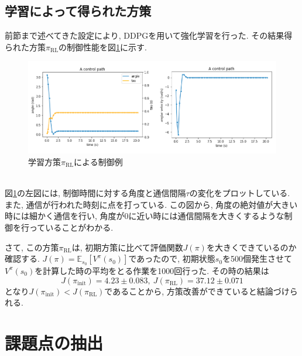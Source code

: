 \documentclass[dvipdfmx]{ampmt}
\newcommand{\expect}{\mathbb{E}}
\begin{document}
\subsection{学習によって得られた方策}
前節まで述べてきた設定により, DDPGを用いて強化学習を行った. その結果得られた方策$\pi_{\textrm{RL}}$の制御性能を図\ref{control_path}に示す. 
\begin{figure}[h]
	\centering
 	\includegraphics[width=12cm]{control_path.png}
 	\caption{学習方策$\pi_{\textrm{RL}}$による制御例} \label{control_path}
\end{figure}\\
図\ref{control_path}の左図には, 制御時間に対する角度と通信間隔$\tau$の変化をプロットしている. また, 通信が行われた時刻に点を打っている. この図から, 角度の絶対値が大きい時には細かく通信を行い, 角度が0に近い時には通信間隔を大きくするような制御を行っていることがわかる. \par
さて, この方策$\pi_{\textrm{RL}}$は, 初期方策に比べて評価関数$J(\pi)$を大きくできているのか確認する. $J(\pi) = \expect_{s_0}[V^{\pi}(s_0)]$であったので, 初期状態$s_0$を500個発生させて$V^{\pi}(s_0)$を計算した時の平均をとる作業を1000回行った. その時の結果は
\begin{equation}
	J(\pi_{\textrm{init}}) = 4.23 \pm 0.083,~J(\pi_{\textrm{RL}}) = 37.12 \pm 0.071 \label{compare_policy}
\end{equation}
となり$J(\pi_{\textrm{init}}) < J(\pi_{\textrm{RL}})$であることから, 方策改善ができていると結論づけられる. 

\section{課題点の抽出}
\end{document}
